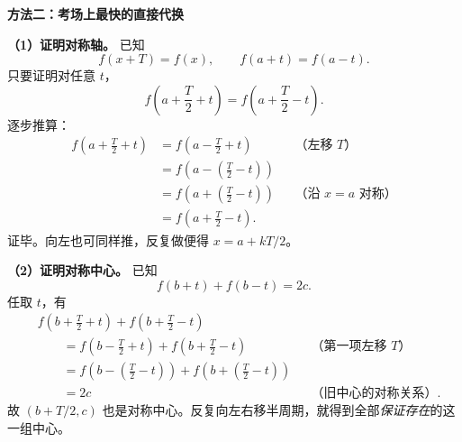 \begin{proofbox}
\textbf{\textcolor{CProof}{方法二：考场上最快的直接代换}}



\textbf{（1）证明对称轴。} 已知
\[
f(x+T)=f(x),\qquad f(a+t)=f(a-t).
\]
只要证明对任意 $t$，
\[
f\left(a+\frac T2+t\right)=f\left(a+\frac T2-t\right).
\]
逐步推算：
\[
\begin{aligned}
f\left(a+\frac T2+t\right)
&=f\left(a-\frac T2+t\right) &&\text{（左移 $T$）}\\
&=f\left(a-\left(\frac T2-t\right)\right)\\
&=f\left(a+\left(\frac T2-t\right)\right) &&\text{（沿 $x=a$ 对称）}\\
&=f\left(a+\frac T2-t\right).
\end{aligned}
\]
证毕。向左也可同样推，反复做便得 $x=a+kT/2$。

\textbf{（2）证明对称中心。} 已知
\[
f(b+t)+f(b-t)=2c.
\]
任取 $t$，有
\[
\begin{aligned}
&f\left(b+\frac T2+t\right)+f\left(b+\frac T2-t\right)\\
&\qquad=f\left(b-\frac T2+t\right)+f\left(b+\frac T2-t\right)
&&\text{（第一项左移 $T$）}\\
&\qquad=f\left(b-\left(\frac T2-t\right)\right)
  +f\left(b+\left(\frac T2-t\right)\right)\\
&\qquad=2c &&\text{（旧中心的对称关系）}.
\end{aligned}
\]
故 $(b+T/2,c)$ 也是对称中心。反复向左右移半周期，就得到全部\emph{保证存在}的这一组中心。

\medskip

\end{proofbox}
\clearpage
